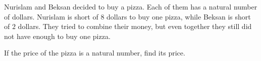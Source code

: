 Nurislam and Beksan decided to buy a pizza. Each of them has a natural number of dollars. Nurislam is short of $8$ dollars to buy one pizza, while Beksan is short of $2$ dollars. They tried to combine their money, but even together they still did not have enough to buy one pizza.



If the price of the pizza is a natural number, find its price.
